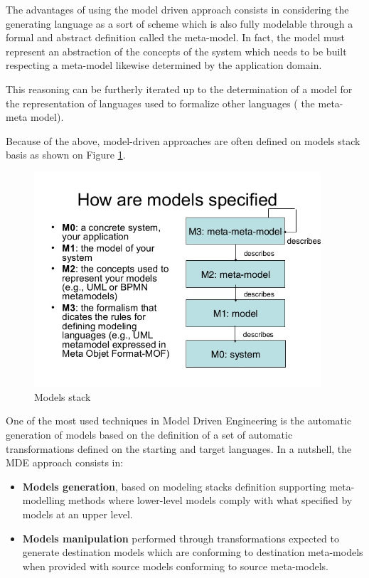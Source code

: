 The advantages of using the model driven approach consists in considering the generating language as a sort of scheme which is also fully modelable through a formal and abstract definition called the meta-model. In fact, the model must represent an abstraction of the concepts of the system which needs to be built respecting a  meta-model likewise determined by the application domain.

This reasoning can be furtherly iterated up to the determination of a model for the representation of languages used to formalize other languages ( the meta-meta model).

Because of the above,  model-driven approaches are often defined on models stack basis as shown on Figure \ref{fig:mde}.

\vspace{0cm}
\begin{figure}[htbp]
  \centering
    \includegraphics[height=8cm]{images/mde}
  \caption{Models stack}
  \label{fig:mde}
\end{figure}
\vspace{0cm}

One of the most used techniques in Model Driven Engineering is the automatic generation of models based on the definition of a set of automatic transformations defined on the starting and target languages. In a nutshell, the MDE approach consists in:

\begin{itemize}
  \item \textbf{Models generation}, based on modeling stacks definition supporting meta-modelling methods where lower-level models comply with what specified by models at an upper level.

  \item \textbf{Models manipulation} performed through transformations expected to generate destination models which are conforming to destination meta-models when provided with source models conforming to source meta-models.
\end{itemize} 

